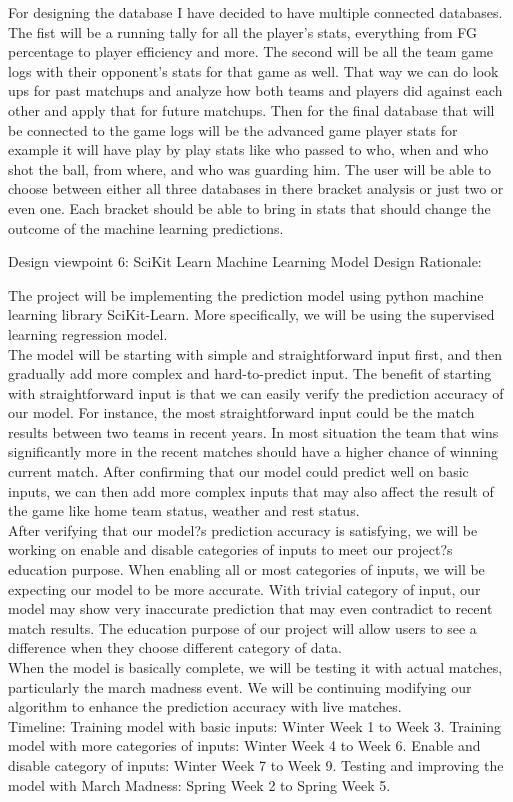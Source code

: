 \documentclass[journal,onecolumn]{IEEEtran}
\begin{document}
For designing the database I have decided to have multiple connected databases. The fist will be a running tally for all the player’s stats, everything from FG percentage to player efficiency and more. The second will be all the team game logs with their opponent’s stats for that game as well. That way we can do look ups for past matchups and analyze how both teams and players did against each other and apply that for future matchups. Then for the final database that will be connected to the game logs will be the advanced game player stats for example it will have play by play stats like who passed to who, when and who shot the ball, from where, and who was guarding him.  The user will be able to choose between either all three databases in there bracket analysis or just two or even one.  Each bracket should be able to bring in stats that should change the outcome of the machine learning predictions.


{\large Design viewpoint 6: SciKit Learn Machine Learning Model}
{\large Design Rationale:}

The project will be implementing the prediction model using python machine learning library SciKit-Learn. More specifically, we will be using the supervised learning regression model. \\
The model will be starting with simple and straightforward input first, and then gradually add more complex and hard-to-predict input. The benefit of starting with straightforward input is that we can easily verify the prediction accuracy of our model. For instance, the most straightforward input could be the match results between two teams in recent years. In most situation the team that wins significantly more in the recent matches should have a higher chance of winning current match. After confirming that our model could predict well on basic inputs, we can then add more complex inputs that may also affect the result of the game like home team status, weather and rest status.\\
After verifying that our model?s prediction accuracy is satisfying, we will be working on enable and disable categories of inputs to meet our project?s education purpose. When enabling all or most categories of inputs, we will be expecting our model to be more accurate. With trivial category of input, our model may show very inaccurate prediction that may even contradict to recent match results. The education purpose of our project will allow users to see a difference when they choose different category of data. \\
When the model is basically complete, we will be testing it with actual matches, particularly the march madness event. We will be continuing modifying our algorithm to enhance the prediction accuracy with live matches. \\
Timeline: Training model with basic inputs: Winter Week 1 to Week 3. Training model with more categories of inputs: Winter Week 4 to Week 6. Enable and disable category of inputs: Winter Week 7 to Week 9. Testing and improving the model with March Madness: Spring Week 2 to Spring Week 5.\\
\end{document}
